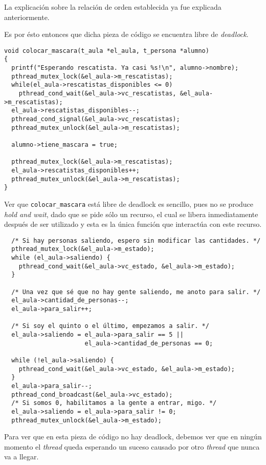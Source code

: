 \documentclass[a4paper]{article}
\begin{document}
La explicación sobre la relación de orden establecida ya fue explicada anteriormente.

Es por ésto entonces que dicha pieza de código se encuentra libre de \textit{deadlock}.

\begin{verbatim}
void colocar_mascara(t_aula *el_aula, t_persona *alumno)
{
  printf("Esperando rescatista. Ya casi %s!\n", alumno->nombre);
  pthread_mutex_lock(&el_aula->m_rescatistas);
  while(el_aula->rescatistas_disponibles <= 0)
    pthread_cond_wait(&el_aula->vc_rescatistas, &el_aula->m_rescatistas);
  el_aula->rescatistas_disponibles--;
  pthread_cond_signal(&el_aula->vc_rescatistas);
  pthread_mutex_unlock(&el_aula->m_rescatistas);

  alumno->tiene_mascara = true;

  pthread_mutex_lock(&el_aula->m_rescatistas);
  el_aula->rescatistas_disponibles++;
  pthread_mutex_unlock(&el_aula->m_rescatistas);
}
\end{verbatim}

Ver que \verb|colocar_mascara| está libre de deadlock es sencillo, pues no se produce
\textit{hold and wait}, dado que se pide sólo un recurso, el cual se libera inmediatamente
después de ser utilizado y esta es la única función que interactúa con este recurso.


\begin{verbatim}
  /* Si hay personas saliendo, espero sin modificar las cantidades. */
  pthread_mutex_lock(&el_aula->m_estado);
  while (el_aula->saliendo) {
    pthread_cond_wait(&el_aula->vc_estado, &el_aula->m_estado);
  }

  /* Una vez que sé que no hay gente saliendo, me anoto para salir. */
  el_aula->cantidad_de_personas--;
  el_aula->para_salir++;

  /* Si soy el quinto o el último, empezamos a salir. */
  el_aula->saliendo = el_aula->para_salir == 5 ||
                      el_aula->cantidad_de_personas == 0;

  while (!el_aula->saliendo) {
    pthread_cond_wait(&el_aula->vc_estado, &el_aula->m_estado);
  }
  el_aula->para_salir--;
  pthread_cond_broadcast(&el_aula->vc_estado);
  /* Si somos 0, habilitamos a la gente a entrar, migo. */
  el_aula->saliendo = el_aula->para_salir != 0;
  pthread_mutex_unlock(&el_aula->m_estado);
\end{verbatim}

Para ver que en esta pieza de código no hay deadlock, debemos ver que en ningún momento el \textit{thread} queda esperando un suceso causado por otro \textit{thread} que nunca va a llegar.
\end{document}
